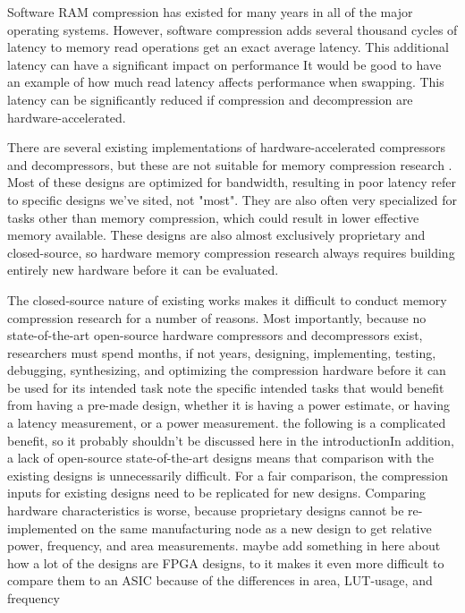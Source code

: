 \documentclass[doublespace,draft,nopageskip]{VTthesis} %
\begin{document}
Software RAM compression has existed for many years in all of the major operating systems. However, software compression adds several thousand cycles of latency to memory read operations{\color{red} get an exact average latency}. This additional latency can have a significant impact on performance {\color{red} It would be good to have an example of how much read latency affects performance when swapping}. This latency can be significantly reduced if compression and decompression are hardware-accelerated.

There are several existing implementations of hardware-accelerated compressors and decompressors, but these are not suitable for memory compression research \cite{ibm,microsoft}. Most of these designs are optimized for bandwidth, resulting in poor latency {\color{red} refer to specific designs we've sited, not "most"}. They are also often very specialized for tasks other than memory compression, which could result in lower effective memory available. These designs are also almost exclusively proprietary and closed-source, so hardware memory compression research always requires building entirely new hardware before it can be evaluated.

The closed-source nature of existing works makes it difficult to conduct memory compression research for a number of reasons. Most importantly, because no state-of-the-art open-source hardware compressors and decompressors exist, researchers must spend months, if not years, designing, implementing, testing, debugging, synthesizing, and optimizing the compression hardware before it can be used for its intended task {\color{red} note the specific intended tasks that would benefit from having a pre-made design, whether it is having a power estimate, or having a latency measurement, or a power measurement}. {\color{red} the following is a complicated benefit, so it probably shouldn't be discussed here in the introduction}{\color{orange}In addition, a lack of open-source state-of-the-art designs means that comparison with the existing designs is unnecessarily difficult. For a fair comparison, the compression inputs for existing designs need to be replicated for new designs. Comparing hardware characteristics is worse, because proprietary designs cannot be re-implemented on the same manufacturing node as a new design to get relative power, frequency, and area measurements.}{\color{yellow} maybe add something in here about how a lot of the designs are FPGA designs, to it makes it even more difficult to compare them to an ASIC because of the differences in area, LUT-usage, and frequency}
\end{document}
